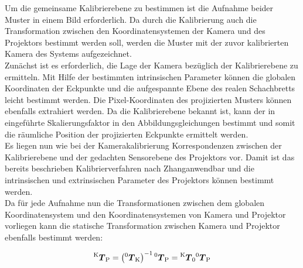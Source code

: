 Um die gemeinsame Kalibrierebene zu bestimmen ist die Aufnahme beider Muster in einem Bild erforderlich. Da durch die Kalibrierung auch die Transformation zwischen den Koordinatensystemen der Kamera und des Projektors bestimmt werden soll, werden die Muster mit der zuvor kalibrierten Kamera des Systems aufgezeichnet.\\
Zunächst ist es erforderlich, die Lage der Kamera bezüglich der Kalibrierebene zu ermitteln. Mit Hilfe der bestimmten intrinsischen Parameter können die globalen Koordinaten der Eckpunkte und die aufgespannte Ebene des realen Schachbretts leicht bestimmt werden. Die Pixel-Koordinaten des projizierten Musters können ebenfalls extrahiert werden. Da die Kalibrierebene bekannt ist, kann der in  eingeführte Skalierungsfaktor in den Abbildungsgleichungen bestimmt und somit die räumliche Position der projizierten Eckpunkte ermittelt werden.\\
Es liegen nun wie bei der Kamerakalibrierung Korrespondenzen zwischen der Kalibrierebene und der gedachten Sensorebene des Projektors vor. Damit ist das bereits beschrieben Kalibrierverfahren nach Zhang\red[Groß?] anwendbar und die intrinsischen und extrinsischen Parameter des Projektors können bestimmt werden.\\
Da für jede Aufnahme nun die Transformationen zwischen dem globalen Koordinatensystem und den Koordinatensystemen von Kamera und Projektor vorliegen kann die statische Transformation zwischen Kamera und Projektor ebenfalls bestimmt werden:

\begin{equation}
{^{\mathrm{K}}\mbox{\boldmath{$T$}}_{\mathrm{P}}} = \left( {^{\mathrm{0}}\mbox{\boldmath{$T$}}_{\mathrm{K}}} \right)^{-1} {^{\mathrm{0}}\mbox{\boldmath{$T$}}_{\mathrm{P}}} = {^{\mathrm{K}}\mbox{\boldmath{$T$}}_{\mathrm{0}}} {^{\mathrm{0}}\mbox{\boldmath{$T$}}_{\mathrm{P}}}
\end{equation}

\\

